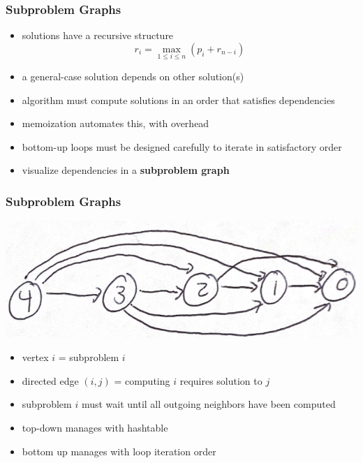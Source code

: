 \documentclass{beamer}
\begin{document}
\begin{frame} \frametitle{Subproblem Graphs}
\begin{itemize}
  \item solutions have a recursive structure
        \[ r_i = \max_{1 \leq i \leq n} (p_i + r_{n-i}) \]
  \item a general-case solution depends on other solution(s)
  \item algorithm must compute solutions in an order that satisfies dependencies
  \item memoization automates this, with overhead
  \item bottom-up loops must be designed carefully to iterate in satisfactory order
  \item visualize dependencies in a \textbf{subproblem graph}
\end{itemize}
\end{frame}

\begin{frame} \frametitle{Subproblem Graphs}
  \begin{center}
    \includegraphics[height=.8in]{subproblem_dependencies.png}
  \end{center}
  \begin{itemize}
  \item vertex $i$ = subproblem $i$
  \item directed edge $(i, j)$ = computing $i$ requires solution to $j$
  \item subproblem $i$ must wait until all outgoing neighbors have been computed
  \item top-down manages with hashtable
  \item bottom up manages with loop iteration order
  \end{itemize}
\end{frame}
\end{document}
